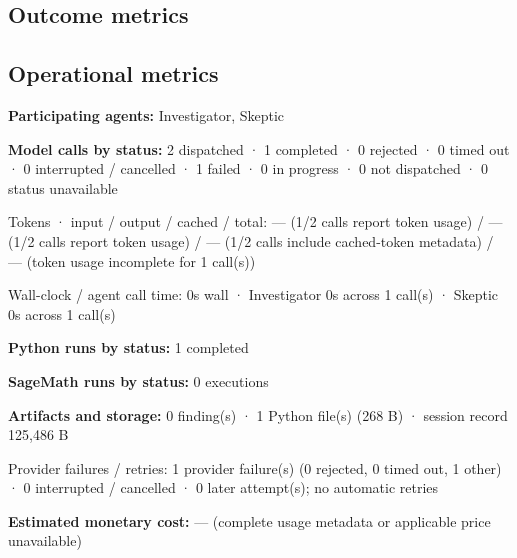 \documentclass[11pt]{article}
\begin{document}
\subsection{Outcome metrics}
\subsection{Operational metrics}
\textbf{Participating agents:} Investigator, Skeptic\par
\textbf{Model calls by status:} 2 dispatched · 1 completed · 0 rejected · 0 timed out · 0 interrupted / cancelled · 1 failed · 0 in progress · 0 not dispatched · 0 status unavailable\par
Tokens · input / output / cached / total: — (1/2 calls report token usage) / — (1/2 calls report token usage) / — (1/2 calls include cached-token metadata) / — (token usage incomplete for 1 call(s))\par
Wall-clock / agent call time: 0s wall · Investigator 0s across 1 call(s) · Skeptic 0s across 1 call(s)\par
\textbf{Python runs by status:} 1 completed\par
\textbf{SageMath runs by status:} 0 executions\par
\textbf{Artifacts and storage:} 0 finding(s) · 1 Python file(s) (268 B) · session record 125,486 B\par
Provider failures / retries: 1 provider failure(s) (0 rejected, 0 timed out, 1 other) · 0 interrupted / cancelled · 0 later attempt(s); no automatic retries\par
\textbf{Estimated monetary cost:} — (complete usage metadata or applicable price unavailable)\par
\end{document}
